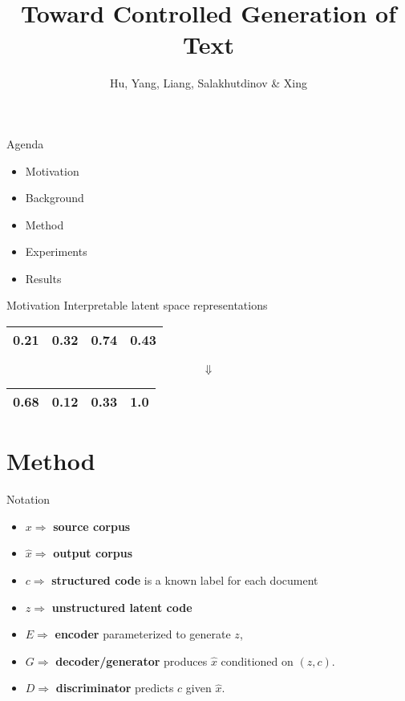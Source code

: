 \documentclass{beamer}
\title{Toward Controlled Generation of Text}
\date{}
\author{Hu, Yang, Liang, Salakhutdinov \& Xing}
\institute{ICML 2017}
\begin{document}
  \maketitle

    \begin{frame}{Agenda}
      \begin{itemize}
      \item Motivation
      \item Background
      \item Method
      \item Experiments
      \item Results
      \end{itemize}
    \end{frame}

    \begin{frame}{Motivation}
      Interpretable latent space representations
      \begin{center}
        \begin{tabular}{ | c | c | c | c | }
          \hline
          0.21 & 0.32 & 0.74 & 0.43 \\  
          \hline
        \end{tabular}
      \end{center}
      {\Huge$$\Downarrow$$}
      \begin{center}
        \begin{tabular}{ | c | c | c | c | }
          \hline
          0.68 & 0.12 & 0.33 & {\color{red}\textbf{1.0}} \\  
          \hline
        \end{tabular}
      \end{center}
    \end{frame}

  \section{Method}
  \begin{frame}{Notation}
    \begin{itemize}
      \item $x \Rightarrow$ \textbf{source corpus}
      \item $\hat{x} \Rightarrow$ \textbf{output corpus}
      \item $c \Rightarrow$ \textbf{structured code} is a known label for each document
      \item $z \Rightarrow$ \textbf{unstructured latent code}
      \item $E \Rightarrow$ \textbf{encoder} parameterized to generate $z$, 
      \item $G \Rightarrow$ \textbf{decoder/generator} produces $\hat{x}$ conditioned on $(z, c)$.
      \item $D \Rightarrow$ \textbf{discriminator} predicts $c$ given $\hat{x}$.
    \end{itemize}
  \end{frame}
\end{document}
